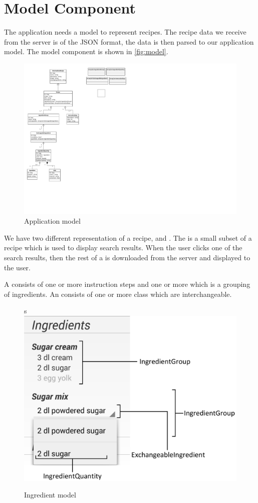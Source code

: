 \pagebreak
\section{Model Component}

The application needs a model to represent recipes. The recipe data we receive from the server is of the JSON format, the data is then parsed to our application model. The model component is shown in \autoref{fig:model}.

\begin{figure}[H]
\centering
\includegraphics[width=0.67\linewidth, page=2]{img/model.pdf}
\caption{Application model}
\label{fig:model}
\end{figure}

We have two different representation of a recipe,  and . The  is a small subset of a recipe which is used to display search results. When the user clicks one of the search results, then the rest of a  is downloaded from the server and displayed to the user.

A  consists of one or more instruction steps and one or more  which is a grouping of ingredients. An  consists of one or more  class which are interchangeable. 

\begin{figure}[H]s
\centering
\includegraphics[width=0.6\linewidth]{img/ingredients.pdf}
\caption{Ingredient model}
\label{fig:ingredients}
\end{figure}

